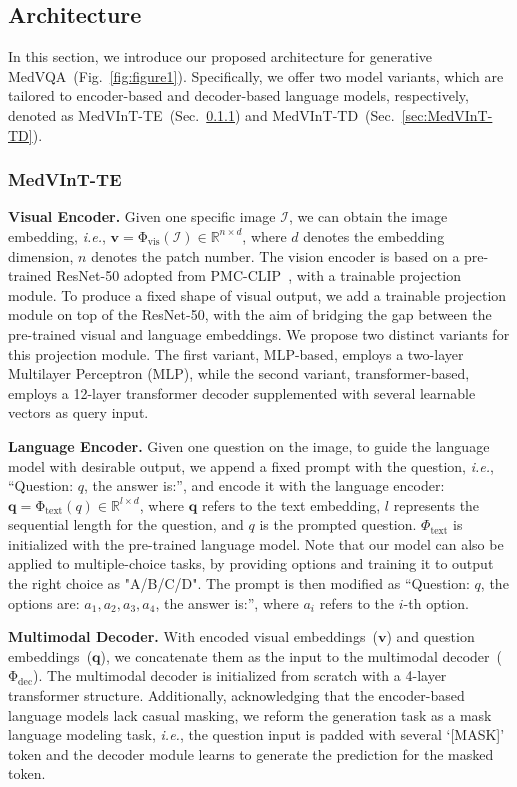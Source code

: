 \documentclass{article}
\begin{document}
\subsection{Architecture}
\label{sec:architecture}
In this section, we introduce our proposed architecture for generative MedVQA~(Fig.~\ref{fig:figure1}).
Specifically, we offer two model variants, which are tailored to encoder-based and decoder-based language models, respectively, denoted as MedVInT-TE~(Sec.~\ref{sec:MedVInT-TE}) and MedVInT-TD~(Sec.~\ref{sec:MedVInT-TD}).


\subsubsection{MedVInT-TE}
\label{sec:MedVInT-TE}
\textbf{Visual Encoder.} 
Given one specific image $\mathcal{I}$, 
we can obtain the image embedding, {\em i.e.}, $\boldsymbol{v} = \mathrm{\Phi}_\text{vis}(\mathcal{I}) \in \mathbb{R}^{n\times d}$,
where $d$ denotes the embedding dimension, $n$ denotes the patch number.
The vision encoder is based on a pre-trained ResNet-50 adopted from PMC-CLIP~\cite{lin2023pmcclip}, with a trainable projection module.
To produce a fixed shape of visual output,
we add a trainable projection module on top of the ResNet-50, with the aim of bridging the gap between the pre-trained visual and language embeddings. 
We propose two distinct variants for this projection module. 
The first variant, MLP-based, employs a two-layer Multilayer Perceptron (MLP), while the second variant, transformer-based, employs a 12-layer transformer decoder supplemented with several learnable vectors as query input.


\textbf{Language Encoder.} 
Given one question on the image,
to guide the language model with desirable output, 
we append a fixed prompt with the question, 
{\em i.e.}, ``Question: $q$, the answer is:'', and encode it with the language encoder: $\boldsymbol{q} = \mathrm{\Phi}_\text{text}(q) \in \mathbb{R}^{l\times d}$,
where $\boldsymbol{q}$ refers to the text embedding, $l$ represents the sequential length for the question, and $q$ is the prompted question.
$\Phi_\text{text}$ is initialized with the pre-trained language model.
Note that our model can also be applied to multiple-choice tasks, 
by providing options and training it to output the right choice as "A/B/C/D". 
The prompt is then modified as ``Question: $q$, the options are: $a_1, a_2, a_3, a_4$, the answer is:'', where $a_i$ refers to the $i$-th option.


\textbf{Multimodal Decoder.}
With encoded visual embeddings~($\boldsymbol{v}$) and question embeddings~($\boldsymbol{q}$), we concatenate them as the input to the multimodal decoder~($\mathrm{\Phi}_\text{dec}$).
The multimodal decoder is initialized from scratch with a 4-layer transformer structure. 
Additionally, acknowledging that the encoder-based language models lack casual masking, we reform the generation task as a mask language modeling task, 
{\em i.e.}, the question input is padded with several `[MASK]' token 
and the decoder module learns to generate the prediction for the masked token.
\end{document}
